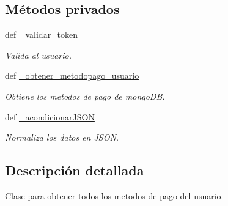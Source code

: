 \subsection*{Métodos privados}
\begin{DoxyCompactItemize}
\item 
def \hyperlink{classsrc_1_1resources_1_1obtener_metodo_pago_1_1_obtener_metodo_pago_aa8a289584c1beead3ae5bd92eacf9dbb}{\-\_\-validar\-\_\-token}
\begin{DoxyCompactList}\small\item\em Valida al usuario. \end{DoxyCompactList}\item 
def \hyperlink{classsrc_1_1resources_1_1obtener_metodo_pago_1_1_obtener_metodo_pago_ae0c197a662ac5d08d339900b33e72243}{\-\_\-obtener\-\_\-metodopago\-\_\-usuario}
\begin{DoxyCompactList}\small\item\em Obtiene los metodos de pago de mongo\-D\-B. \end{DoxyCompactList}\item 
def \hyperlink{classsrc_1_1resources_1_1obtener_metodo_pago_1_1_obtener_metodo_pago_a6104034a6e0b1c3376785ba2d55d1a9e}{\-\_\-acondicionar\-J\-S\-O\-N}
\begin{DoxyCompactList}\small\item\em Normaliza los datos en J\-S\-O\-N. \end{DoxyCompactList}\end{DoxyCompactItemize}


\subsection{Descripción detallada}
Clase para obtener todos los metodos de pago del usuario. 



